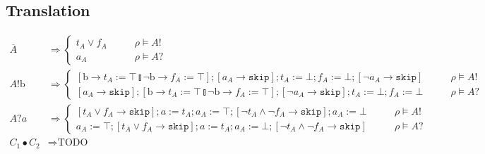 \documentclass{article}
\begin{document}
\subsection{Translation}
\begin{align*}
    \overline{A} & \Rightarrow \left\{ \begin{matrix} t_A \vee f_A & \qquad \rho \vDash A! \\ a_A & \qquad \rho \vDash A? \end{matrix} \right. \\
    A!\mathrm{b} & \Rightarrow \left\{ \begin{matrix} [\mathrm{b} \rightarrow t_A := \top \talloblong \neg \mathrm{b} \rightarrow f_A := \top]; [a_A \rightarrow \mathtt{skip}]; t_A := \bot; f_A := \bot; [\neg a_A \rightarrow \mathtt{skip}] & \qquad \rho \vDash A! \\
                                                      [a_A \rightarrow \mathtt{skip}]; [\mathrm{b} \rightarrow t_A := \top \talloblong \neg \mathrm{b} \rightarrow f_A := \top]; [\neg a_A \rightarrow \mathtt{skip}]; t_A := \bot; f_A := \bot & \qquad \rho \vDash A? \end{matrix} \right. \\
    A?a & \Rightarrow \left\{ \begin{matrix} [t_A \vee f_A \rightarrow \mathtt{skip}]; a := t_A; a_A := \top; [\neg t_A \wedge \neg f_A \rightarrow \mathtt{skip}]; a_A := \bot & \qquad \rho \vDash A! \\
                                             a_A := \top; [t_A \vee f_A \rightarrow \mathtt{skip}]; a := t_A; a_A := \bot; [\neg t_A \wedge \neg f_A \rightarrow \mathtt{skip}] & \qquad \rho \vDash A? \end{matrix} \right. \\
    C_1 \bullet C_2 & \Rightarrow \text{TODO}
\end{align*}

\newpage
\end{document}
